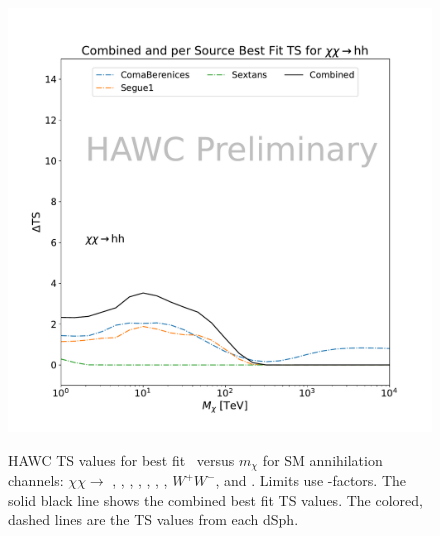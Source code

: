 \begin{figure}[h]
{    \includegraphics[scale=0.21]{figures/mtd_hawc_dm/results/CombinedTS_New_duck_hh_.pdf}
    }
    \caption{HAWC TS values for best fit \sv~versus $m_\chi$ for SM annihilation channels: $\chi\chi \rightarrow $ , , , , , , , $W^+ W^-$, and . Limits use \LS \J-factors. The solid black line shows the combined best fit TS values. The colored, dashed lines are the TS values from each dSph.}
\label{fig:mtd_TS_1of2}
\end{figure}

